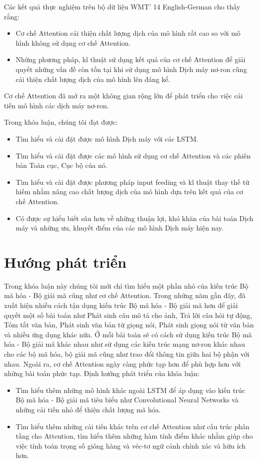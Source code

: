 Các kết quả thực nghiệm trên bộ dữ liệu WMT' 14 English-German cho thấy rằng:
\begin{itemize}
	\item Cơ chế Attention cải thiện chất lượng dịch của mô hình rất cao so với mô hình không sử dụng cơ chế Attention.
	\item Những phương pháp, kĩ thuật sử dụng kết quả của cơ chế Attention để giải quyết những vấn đề còn tồn tại khi sử dụng mô hình Dịch máy nơ-ron cũng cải thiện chất lượng dịch của mô hình lên đáng kể.
\end{itemize}

Cơ chế Attention đã mở ra một không gian rộng lớn để phát triển cho việc cải tiến mô hình các dịch máy nơ-ron.

Trong khóa luận, chúng tôi đạt được:
\begin{itemize}
	\item Tìm hiểu và cài đặt được mô hình Dịch máy với các LSTM.
	\item Tìm hiểu và cài đặt được các mô hình sử dụng cơ chế Attention và các phiên bản Toàn cục, Cục bộ của nó.
	\item Tìm hiểu và cài đặt được phương pháp input feeding và kĩ thuật thay thế từ hiếm nhằm nâng cao chất lượng dịch của mô hình dựa trên kết quả của cơ chế Attention.
	\item Có được sự hiểu biết sâu hơn về những thuận lợi, khó khăn của bài toán Dịch máy và những ưu, khuyết điểm của các mô hình Dịch máy hiện nay.
\end{itemize}

\section{Hướng phát triển}
Trong khóa luận này chúng tôi mới chỉ tìm hiểu một phần nhỏ của kiến trúc Bộ mã hóa - Bộ giải mã cũng như cơ chế Attention. Trong những năm gần đây, đã xuất hiện nhiều cách tận dụng kiến trúc Bộ mã hóa - Bộ giải mã hơn để giải quyết một số bài toán như Phát sinh câu mô tả cho ảnh, Trả lời câu hỏi tự động, Tóm tắt văn bản, Phát sinh văn bản từ giọng nói, Phát sinh giọng nói từ văn bản và nhiều ứng dụng khác nữa. Ở mỗi bài toán sẽ có cách sử dụng kiến trúc Bộ mã hóa - Bộ giải mã khác nhau như sử dụng các kiến trúc mạng nơ-ron khác nhau cho các bộ mã hóa, bộ giải mã cũng như trao đổi thông tin giữa hai bộ phận với nhau. Ngoài ra, cơ chế Attention ngày càng phức tạp hơn để phù hợp hơn với những bài toán phức tạp. Định hướng phát triển của khóa luận:
\begin{itemize}
	\item Tìm hiểu thêm những mô hình khác ngoài LSTM để áp dụng vào kiến trúc Bộ mã hóa - Bộ giải mã tiêu biểu như Convolutional Neural Networks và những cải tiến nhỏ để thiện chất lượng mã hóa.
	\item Tìm hiểu thêm những cải tiến khác trên cơ chế Attention như cấu trúc phân tầng cho Attention, tìm hiểu thêm những hàm tính điểm khác nhằm giúp cho việc tính toán trọng số gióng hàng và véc-tơ ngữ cảnh chính xác và hữu ích hơn. 
\end{itemize}



